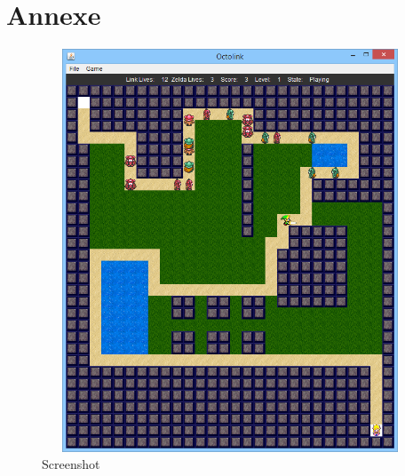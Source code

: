 \chapter{Annexe}

\begin{figure}[ht!]
  \center
  \includegraphics[width=14cm,height=12cm,keepaspectratio]{resources/screenshot.png}
  \caption{Screenshot}
  \label{fig:Screenshot}
\end{figure}
